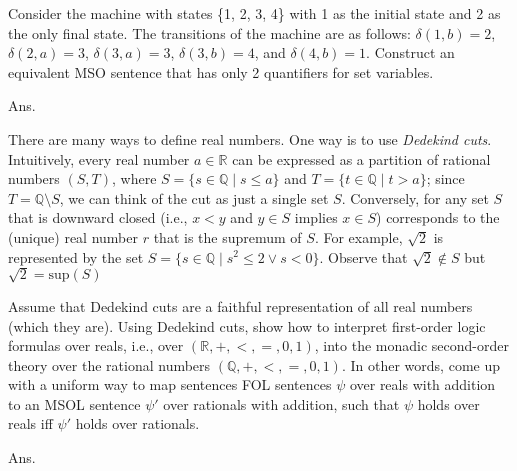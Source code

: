 \documentclass[11pt]{homework}
\begin{document}
Consider the machine with states \{1, 2, 3, 4\}
with 1 as the initial state and 2 as the only final state.
The transitions of the machine are as follows:
\(\delta(1,b)=2\), \(\delta(2,a)=3\), \(\delta(3,a)=3\), \(\delta(3,b)=4\),
and \(\delta(4,b)=1\).
Construct an equivalent MSO sentence that has only 2 quantifiers for set variables.

Ans.


\question
There are many ways to define real numbers.
One way is to use \emph{Dedekind cuts}.
Intuitively, every real number \(a \in \mathbb{R}\) can be expressed as a partition of rational numbers \((S,T)\),
where \(S = \{s \in \mathbb{Q} \mid s \leq a\}\) and \(T = \{t \in \mathbb{Q} \mid t > a\}\);
since \(T = \mathbb{Q}\setminus S\),
we can think of the cut as just a single set \(S\).
Conversely, for any set \(S\) that is downward closed
(i.e., \(x < y\) and \(y \in S\) implies \(x \in S\))
corresponds to the (unique) real number \(r\) that is the supremum of \(S\).
For example, \(\sqrt{2}\) is represented by the set 
\(S = \{s \in \mathbb{Q} \mid s^2 \leq 2 \lor s < 0\}\).
Observe that \(\sqrt{2} \not\in S\) but \(\sqrt{2} = \text{sup}(S)\)

Assume that Dedekind cuts are a faithful representation of all real numbers (which they are).
Using Dedekind cuts, show how to interpret first-order logic formulas over reals,
i.e., over \((\mathbb{R}, +, <, =, 0, 1)\),
into the monadic second-order theory over the rational numbers
\((\mathbb{Q}, +, <, =, 0, 1)\).
In other words, come up with a uniform way to map sentences FOL sentences \(\psi\)
over reals with addition to an MSOL sentence \(\psi'\) over rationals with addition,
such that \(\psi\) holds over reals iff \(\psi'\) holds over rationals.

Ans.
\end{document}
